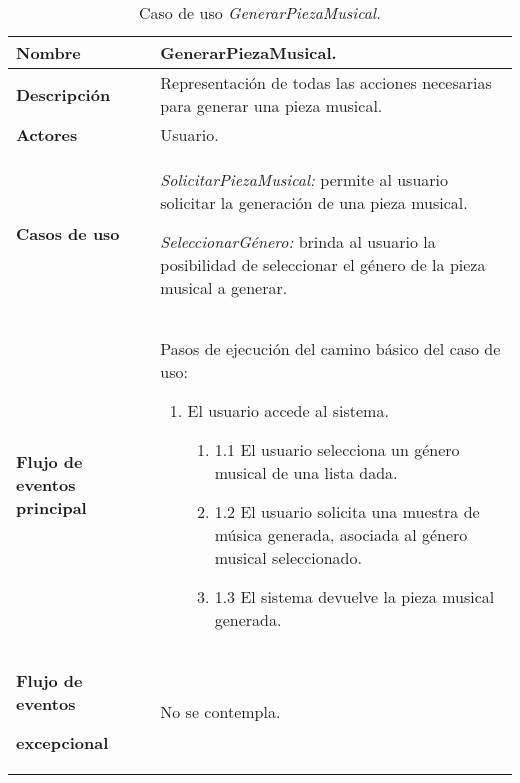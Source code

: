 \begin{longtable}{|>{\columncolor[rgb]{0.75,0.75,0.75}}p{3cm}|p{11cm}|}
\caption{Caso de uso \emph{GenerarPiezaMusical.}} \\
\hline \centerline{\textcolor[rgb]{1.00,1.00,1.00}{\textbf{\small Nombre}}} & {\small GenerarPiezaMusical.}
\\
\hline \centerline{\textcolor[rgb]{1.00,1.00,1.00}{\textbf{\small Descripción}}} & {\small Representación de todas las acciones necesarias para generar una pieza musical.}
\\
\hline \centerline{\textcolor[rgb]{1.00,1.00,1.00}{\textbf{\small Actores}}} & {\small Usuario.}
\\
\hline
\begin{center}
\textcolor[rgb]{1.00,1.00,1.00}{\textbf{\small Casos de uso}}
\end{center}
\begin{center}

\end{center}
& {\small \emph{SolicitarPiezaMusical:} permite al usuario solicitar la generación de una
pieza musical.}

{\small \emph{SeleccionarGénero:} brinda al usuario la posibilidad de seleccionar el género de la pieza musical a generar.}

\\
\hline
\begin{center}
\end{center}
\begin{center}
\textcolor[rgb]{1.00,1.00,1.00}{\textbf{\small Flujo de eventos
principal}}
\end{center}
& {\small Pasos de ejecución del camino básico del caso de uso:}

{\small
\begin{enumerate}
    \item El usuario accede al sistema.

    \begin{enumerate}
        \item[] 1.1 El usuario selecciona un género musical de una lista dada.
        \item[] 1.2 El usuario solicita una muestra de música generada, asociada al género musical seleccionado.
        \item[] 1.3 El sistema devuelve la pieza musical generada.
    \end{enumerate}
\end{enumerate}
}
\\
\hline \centerline{\textcolor[rgb]{1.00,1.00,1.00}{\textbf{\small Flujo de eventos}}}
\centerline{\textcolor[rgb]{1.00,1.00,1.00}{\textbf{\small excepcional}}} & {\small No se contempla.}
\\
\hline
\end{longtable}